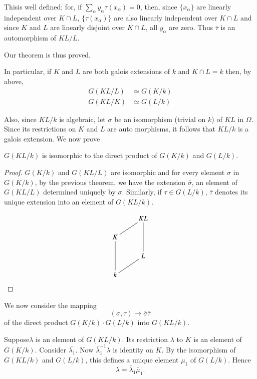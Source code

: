 This\pageoriginale is well defined; for, if $\sum_\alpha y_\alpha
\tau(x_\alpha) 
= 0$, then, since $\{ x_\alpha\}$ are linearly independent over $K
\cap L$, $\{ \tau (x_\alpha)\}$ are also linearly independent over $K
\cap L$ and since $K$ and $L$ are linearly disjoint over $K \cap L$,
all $y_\alpha$ are zero. Thus $\bar{\tau}$ is an automorphism of
$KL/L$.  

Our theorem is thus proved.

In particular, if $K$ and $L$ are both galois extensions of $k$ and $K
\cap L= k$ then, by above, 
\begin{align*}
G (KL/L) & \simeq G (K/k)\\
G (KL/K) & \simeq G (L/k)
\end{align*}

Also, since $KL/k$ is algebraic, let $\sigma$ be an isomorphism
(trivial on $k$) of $KL$ in $\Omega$. Since its restrictions on $K$
and $L$ are auto morphisms, it follows that $KL/k$ is a galois
extension. We now prove 

\begin{thm}\label{c5:thm8}%
$G(KL/k)$ is isomorphic to the direct product of $G(K/k)$ and 
  $G(L/k)$. 
\end{thm} 

\begin{proof}
$G(K/k)$ and $G (KL/L)$ are isomorphic and for every element $\sigma$
  in $G(K/k)$, by the previous theorem, we have the extension
  $\bar{\sigma}$, an element of $G(KL/L)$ determined uniquely by
  $\sigma$. Similarly, if $\tau \in G (L /k)$, $\bar{\tau}$
  denotes its unique extension into an element of $G(KL/k)$. 

\[
\xymatrix@R=0.5cm{
& KL\ar@{-}[dl] \ar@{-}[dd]\\
K \ar@{-}[dd] &\\
& L \\
k \ar@{-}[ur]&  
}
\]
\end{proof}

We now consider the mapping 
$$
(\sigma, \tau) \to \bar{\sigma} \bar{\tau}
$$
of the direct product $G(K/k)\cdot G(L/k)$ into $G (KL/k)$. 

Suppose\pageoriginale $\lambda$ is an element of $G(KL/k)$. Its
restriction 
$\lambda$ to $K$ is an element of $G(K/k)$. Consider
$\bar{\lambda_1}$. Now $\bar{\lambda}^{-1}_1 \lambda$ is identity on
$K$. By the isomorphism of $G(KL/k)$ and $G(L/k)$, this defines a
unique element $\mu_1$ of $G(L/k)$. Hence 
$$
\lambda = \bar{\lambda}_1 \bar{\mu}_1.
$$


